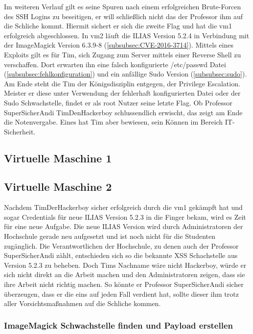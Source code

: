 \documentclass[10pt, a4paper,onecolumn ,titlepage]{article}
\begin{document}
    Im weiteren Verlauf gilt es seine Spuren nach einem erfolgreichen Brute-Forcen des SSH Logins zu beseitigen, er will schließlich nicht das der Professor ihm auf die Schliche kommt.
    Hiermit sichert er sich die zweite Flag und hat die \ac{vm}1 erfolgreich abgeschlossen.
    In \ac{vm}2 läuft die ILIAS Version 5.2.4 in Verbindung mit der ImageMagick Version 6.3.9-8 (\ref{subsubsec:CVE-2016-3714}).
    Mittels eines Exploits gilt es für Tim, sich Zugang zum Server mittels einer Reverse Shell zu verschaffen.
    Dort erwarten ihn eine falsch konfigurierte /etc/passwd Datei (\ref{subsubsec:fehlkonfiguration}) und ein anfällige Sudo Version (\ref{subsubsec:sudo}).
    Am Ende steht die Tim der Königsdisziplin entgegen, der Privilege Escalation.
    Meister er diese unter Verwendung der fehlerhaft konfigurierten Datei oder der Sudo Schwachstelle, findet er als root Nutzer seine letzte Flag.
    Ob Professor SuperSicherAndi TimDenHackerboy schlussendlich erwischt, das zeigt am Ende die Notenvergabe.
    Eines hat Tim aber bewiesen, sein Können im Bereich IT-Sicherheit.



    \subsection{Virtuelle Maschine 1}
    \label{subsec:vm1}

    \subsection{Virtuelle Maschine 2}
    \label{subsec:vm2}
    Nachdem TimDerHackerboy sicher erfolgreich durch die \ac{vm}1 gekämpft hat und sogar Credentials für neue ILIAS Version 5.2.3 in die Finger bekam, wird es Zeit für eine neue Aufgabe.
    Die neue ILIAS Version wird durch Administratoren der Hochschule gerade neu aufgesetzt und ist noch nicht für die Studenten zugänglich.
    Die Verantwortlichen der Hochschule, zu denen auch der Professor SuperSicherAndi zählt, entschieden sich so die bekannte XSS Schachstelle aus Version 5.2.3 zu beheben.
    Doch Tims Nachname wäre nicht Hackerboy, würde er sich nicht direkt an die Arbeit machen und den Administratoren zeigen, dass sie ihre Arbeit nicht richtig machen.
    So könnte er Professor SuperSicherAndi sicher überzeugen, dass er die eins auf jeden Fall verdient hat, sollte dieser ihm trotz aller Vorsichtsmaßnahmen auf die Schliche kommen.

    \subsubsection{ImageMagick Schwachstelle finden und Payload erstellen}
    \label{subsubsec:imageMagickFinden}
\end{document}
